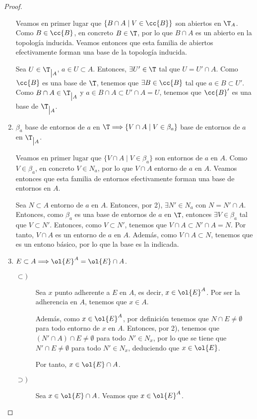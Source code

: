 \begin{proof}
\begin{enumerate}
    Veamos en primer lugar que $\{B\cap A\mid V\in \cc{B}\}$ son abiertos en $\T_A$. Como $B\in \cc{B}$, en concreto $B\in \T$, por lo que $B\cap A$ es un abierto en la topología inducida. Veamos entonces que esta familia de abiertos efectivamente forman una base de la topología inducida.

    Sea $U\in \T_{\big| A}$, $a\in U\subset A$. Entonces, $\exists U'\in \T$ tal que $U=U'\cap A$. Como $\cc{B}$ es una base de $\T$, tenemos que $\exists B\in \cc{B}$ tal que $a\in B \subset U'$. Como $B\cap A\in \T_{\big|A}$ y $a\in B\cap A\subset U'\cap A=U$, tenemos que $\cc{B}'$ es una base de $\T_{\big| A}$.
    
    \item $\beta_a$ base de entornos de $a$ en $\T \Longrightarrow \{V\cap A\mid V\in \beta_a\}$ base de entornos de $a$ en $\T_{\big| A}$.

    Veamos en primer lugar que $\{V\cap A\mid V\in \beta_a\}$ son entornos de $a$ en $A$. Como $V\in \beta_a$, en concreto $V\in N_a$, por lo que $V\cap A$ entorno de $a$ en $A$. Veamos entonces que esta familia de entornos efectivamente forman una base de entornos en $A$.

    Sea $N\subset A$ entorno de $a$ en $A$. Entonces, por 2), $\exists N'\in N_a$ con $N=N'\cap A$. Entonces, como $\beta_a$ es una base de entornos de $a$ en $\T$, entonces $\exists V\in \beta_a$ tal que $V\subset N'$. Entonces, como $V\subset N'$, tenemos que $V\cap A \subset N'\cap A = N$. Por tanto, $V\cap A$ es un entorno de $a$ en $A$. Además, como $V \cap A\subset N$, tenemos que es un entono básico, por lo que la base es la indicada.
    
    \item $E\subset A\Longrightarrow \ol{E}^A = \ol{E}\cap A$.
    \begin{description}
        \item[$\subset)$] Sea $x$ punto adherente a $E$ en $A$, es decir, $x\in \ol{E}^A$. Por ser la adherencia en $A$, tenemos que $x\in A$. 
        
        Además, como $x\in \ol{E}^A$, por definición tenemos que $N\cap E\neq \emptyset$ para todo entorno de $x$ en $A$. Entonces, por 2), tenemos que $(N'\cap A)\cap E\neq \emptyset$ para todo $N'\in N_x$, por lo que se tiene que $N'\cap E\neq \emptyset$ para todo $N'\in N_x$, deduciendo que $x\in \ol{E}$.

        Por tanto, $x\in \ol{E}\cap A$.

        \item[$\supset)$] Sea $x\in \ol{E}\cap A$. Veamos que $x\in \ol{E}^A$.


\end{description}
\end{enumerate}
\end{proof}
